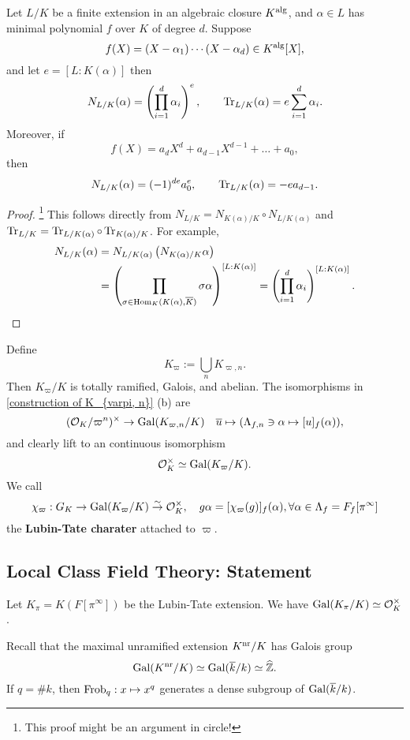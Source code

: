 \begin{lemma}\label{compute norm and trace from minimal polynomial}
    Let $L/K$ be a finite extension in an algebraic closure $K^{\mathrm{alg}}$, and $\alpha\in L$ has minimal polynomial $f$ over $K$ of degree $d$. Suppose \[f(X) = (X-\alpha_1)\cdots(X-\alpha_d)\in K^{\mathrm{alg}}[X],\] and let $e = [L : K(\alpha)]$
    then \[N_{L/K}(\alpha) = \left(\prod_{i = 1}^d \alpha_i\right)^e,\qquad \operatorname{Tr}_{L/K}(\alpha) = e\sum_{i = 1}^d \alpha_i.\]
    Moreover, if \[f(X) = a_dX^d + a_{d-1}X^{d-1} + \dots + a_0,\]then \[N_{L/K}(\alpha) = (-1)^{de}a_0^e,\qquad \operatorname{Tr}_{L/K}(\alpha) = -ea_{d-1}.\]
\end{lemma}
\begin{proof}\footnote{This proof might be an argument in circle!}
    This follows directly from $N_{L/K} = N_{K(\alpha)/K}\circ N_{L/K(\alpha)}$ and $\operatorname{Tr}_{L/K} = \operatorname{Tr}_{L/K(\alpha)}\circ \operatorname{Tr}_{K(\alpha)/K}$.
    For example,
    \begin{align*}
        N_{L/K}(\alpha) &= N_{L/K(\alpha)}\left( N_{K(\alpha)/K}\alpha \right)\\ &
        = \left( \prod_{\sigma\in\operatorname{Hom}_{K}(K(\alpha), \overline K)}\sigma\alpha \right)^{[L : K(\alpha)]} = \left( \prod_{i=1}^d\alpha_i  \right)^{[L : K(\alpha)]}.\qedhere
    \end{align*}
\end{proof}


Define \[K_\varpi := \bigcup_{n} K_{\varpi, n}.\]
Then $K_\varpi/K$ is totally ramified, Galois, and abelian.
The isomorphisms in \cref{construction of K_{varpi, n}} (b) are
\[(\mathcal{O}_K/\varpi^n)^\times\to \operatorname{Gal}(K_{\varpi, n}/K)\quad \overline{u}\mapsto (\Lambda_{f, n}\ni \alpha\mapsto [u]_f(\alpha)),\]
and clearly lift to an continuous isomorphism
\[\mathcal{O}_K^\times\simeq \operatorname{Gal}(K_\varpi/K).\]
We call \[\chi_\varpi : G_K\to\operatorname{Gal}(K_\varpi/K)\stackrel{\sim}{\rightarrow} \mathcal{O}_K^\times,\quad g\alpha = [\chi_\varpi(g)]_{f}(\alpha),\forall\alpha\in \Lambda_f = F_f[\pi^\infty]\]
the \textbf{Lubin-Tate charater} attached to $\varpi$.


\subsection{Local Class Field Theory: Statement}
Let $K_\pi = K(F[\pi^\infty])$ be the Lubin-Tate extension. We have $\operatorname{Gal}(K_\pi/K)\simeq \mathcal{O}_K^\times$.

Recall that the maximal unramified extension $K^{\mathrm{nr}}/K$ has Galois group \[\operatorname{Gal}(K^{\mathrm{nr}}/K)\simeq\operatorname{Gal}(\overline k/k)\simeq\widehat{\mathbb{Z}}.\]
If $q = \# k$, then $\operatorname{Frob}_q : x\mapsto x^q$ generates a dense subgroup of $\operatorname{Gal}(\overline k/k)$.

